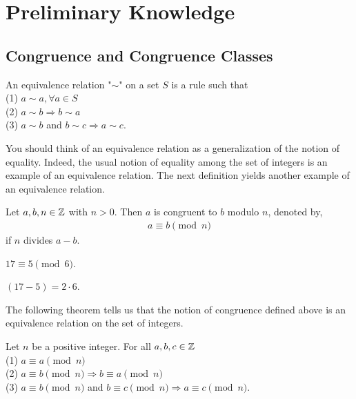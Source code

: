 \chapter{Preliminary Knowledge}\label{chp:pre1}

\section{Congruence and Congruence Classes}

\begin{definition}{}{}
    An equivalence relation "$\sim$" on a set $S$ is a rule such that \\
    (1) $a\sim a, \forall a\in S$\\
    (2) $a\sim b\Rightarrow b\sim a$\\
    (3) $a\sim b$ and $b\sim c\Rightarrow a\sim c$.   
\end{definition}

You should think of an equivalence relation as a generalization of the notion of equality. Indeed, the usual
notion of equality among the set of integers is an example of an equivalence relation. The next definition
yields another example of an equivalence relation.


\begin{definition}{}{}
    Let $a,b,n\in\mathbb{Z}$ with $n>0$. Then $a$ is congruent to $b$ modulo $n$, denoted by, 
    \begin{align*}
        a \equiv b \pmod n
    \end{align*}
    if $n$ divides $a-b$.
\end{definition}

\begin{example}{}{}
    $17\equiv 5\pmod 6$.
\end{example}
    $(17-5)= 2\cdot 6$.

The following theorem tells us that the notion of congruence defined above is an equivalence relation on the
set of integers.

\begin{theorem}{}{}
    Let $n$ be a positive integer. For all $a,b,c\in\mathbb{Z}$\\
    (1) $a\equiv a\pmod n$\\
    (2) $a\equiv b\pmod n\Rightarrow b\equiv a\pmod n$\\
    (3) $a\equiv b\pmod n$ and $b\equiv c\pmod n\Rightarrow a\equiv c\pmod n$.  
\end{theorem}


